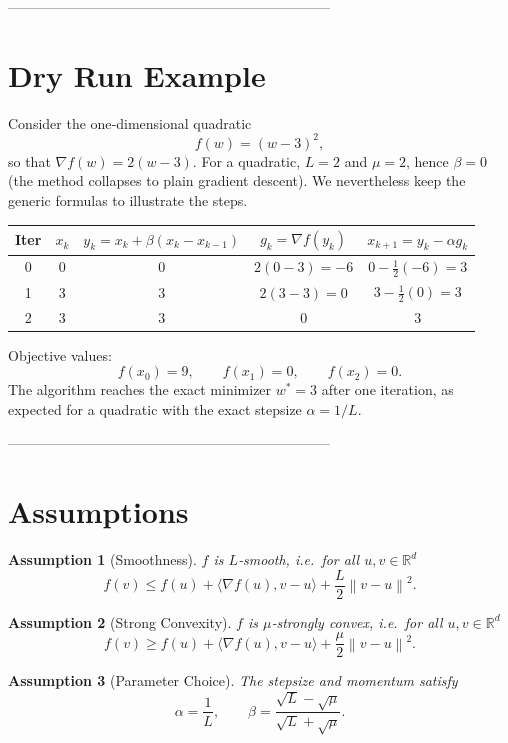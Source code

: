 \documentclass{article}
\newtheorem{assumption}{Assumption}
\newcommand{\norm}[1]{\left\lVert#1\right\rVert}
\newcommand{\ip}[2]{\langle #1,#2\rangle}
\newcommand{\grad}{\nabla}
\begin{document}
---------------------------------------------------------------------

\section*{Dry Run Example}
Consider the one‑dimensional quadratic
\[
f(w) = (w-3)^{2},
\]
so that $\grad f(w)=2(w-3)$.  
For a quadratic, $L=2$ and $\mu=2$, hence $\beta=0$ (the method collapses to plain gradient descent).  
We nevertheless keep the generic formulas to illustrate the steps.

\begin{center}
\begin{tabular}{c|c|c|c|c}
\textbf{Iter} & $x_{k}$ & $y_{k}=x_{k}+\beta(x_{k}-x_{k-1})$ & $g_{k}=\grad f(y_{k})$ & $x_{k+1}=y_{k}-\alpha g_{k}$\\ \hline
0 & $0$ & $0$ & $2(0-3)=-6$ & $0-\frac{1}{2}(-6)=3$\\
1 & $3$ & $3$ & $2(3-3)=0$ & $3-\frac{1}{2}(0)=3$\\
2 & $3$ & $3$ & $0$ & $3$\\
\end{tabular}
\end{center}

Objective values:
\[
f(x_{0})=9,\qquad f(x_{1})=0,\qquad f(x_{2})=0.
\]
The algorithm reaches the exact minimizer $w^{*}=3$ after one iteration, as expected for a quadratic with the exact stepsize $\alpha=1/L$.

---------------------------------------------------------------------

\section*{Assumptions}
\begin{assumption}[Smoothness]\label{as:smooth}
$f$ is $L$‑smooth, i.e.\ for all $u,v\in\mathbb R^{d}$
\[
f(v)\le f(u)+\ip{\grad f(u)}{v-u}+\frac{L}{2}\norm{v-u}^{2}.
\]
\end{assumption}
\begin{assumption}[Strong Convexity]\label{as:strong}
$f$ is $\mu$‑strongly convex, i.e.\ for all $u,v\in\mathbb R^{d}$
\[
f(v)\ge f(u)+\ip{\grad f(u)}{v-u}+\frac{\mu}{2}\norm{v-u}^{2}.
\]
\end{assumption}
\begin{assumption}[Parameter Choice]\label{as:param}
The stepsize and momentum satisfy
\[
\alpha=\frac{1}{L},\qquad 
\beta=\frac{\sqrt{L}-\sqrt{\mu}}{\sqrt{L}+\sqrt{\mu}}.
\]
\end{assumption}
\end{document}
